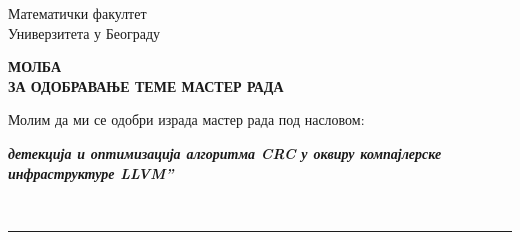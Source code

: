 \documentclass[a4paper]{article}
\def\zn{,\kern-0.09em,}
\begin{document}
\thispagestyle{empty}

\begin{flushleft}
Математички факултет\\
Универзитета у Београду
\end{flushleft}

\bigskip

\begin{center}
\textbf{МОЛБА\\
ЗА ОДОБРАВАЊЕ ТЕМЕ МАСТЕР РАДА
}\end{center}

\bigskip

\begin{flushleft}
Молим да ми се одобри израда мастер рада под насловом:
\end{flushleft}

\begin{minipage}{16cm}
\textbf{\textit{ детекција и оптимизација алгоритма CRC у оквиру компајлерске инфраструктуре LLVM''}}
\end{minipage}\\
\rule[4mm]{17.5cm}{.05mm}
\end{document}
